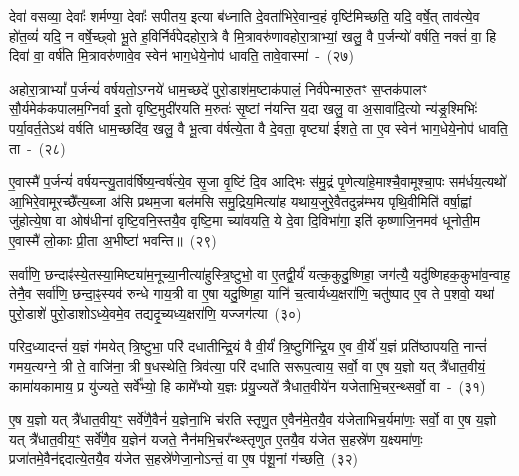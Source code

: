 देवा॑ वसव्या॒ देवाः᳚ शर्मण्या॒ देवाः᳚ सपीतय॒ इत्या ब॑ध्नाति दे॒वता॑भिरे॒वान्व॒हं वृष्टि॑मिच्छति॒ यदि॒ वर्\mbox{}षे॒त् ताव॑त्ये॒व हो॑त॒व्यं॑ यदि॒ न वर्\mbox{}षे॒च्छ्वो भू॒ते ह॒विर्निर्व॑पेदहोरा॒त्रे वै मि॒त्रावरु॑णावहोरा॒त्राभ्यां॒ खलु॒ वै प॒र्जन्यो॑ वर्\mbox{}षति॒ नक्तं॑ वा॒ हि दिवा॑ वा॒ वर्\mbox{}ष॑ति मि॒त्रावरु॑णावे॒व स्वेन॑ भाग॒धेये॒नोप॑ धावति॒ तावे॒वास्मा॑~-~(२७)

अहोरा॒त्रा\-भ्यां᳚ प॒र्जन्यं॑ वर्\mbox{}षयतो॒\-ऽग्नये॑ धाम॒च्छदे॑ पुरो॒डाश॑\-म॒ष्टा\-क॑पालं॒ निर्व॑पेन्मारु॒तꣳ स॒प्तक॑पालꣳ सौ॒र्यमेक॑कपालम॒ग्निर्वा इ॒तो वृष्टि॒मुदी॑रयति म॒रुतः॑ सृ॒ष्टां न॑यन्ति य॒दा खलु॒ वा अ॒सावा॑दि॒त्यो न्य॑ङ्र॒श्मिभिः॑ पर्या॒वर्त॒ते\-ऽथ॑ वर्\mbox{}षति धाम॒च्छदि॑व॒ खलु॒ वै भू॒त्वा व॑र्\mbox{}षत्ये॒ता वै दे॒वता॒ वृष्ट्या॑ ईशते॒ ता ए॒व स्वेन॑ भाग॒धेये॒नोप॑ धावति॒ ता~-~(२८)

ए॒वास्मै॑ प॒र्जन्यं॑ वर्\mbox{}षयन्त्यु॒ताव॑र्\mbox{}षिष्य॒न्वर्\mbox{}ष॑त्ये॒व सृ॒जा वृ॒ष्टिं दि॒व आद्भिः स॑मु॒द्रं पृ॒णेत्या॑हे॒माश्चै॒वामूश्चा॒पः सम॑र्धय॒त्यथो॑ आ॒भिरे॒वामूरच्छै᳚त्य॒ब्जा अ॑सि प्रथम॒जा बल॑मसि समु॒द्रिय॒मित्या॑ह यथाय॒जुरे॒वैतदुन्न॑म्भय पृथि॒वीमिति॑ वर्\mbox{}षा॒ह्वां जु॑होत्ये॒षा वा ओष॑धीनां वृष्टि॒वनि॒स्तयै॒व वृष्टि॒मा च्या॑वयति॒ ये दे॒वा दि॒विभा॑गा॒ इति॑ कृष्णाजि॒नमव॑ धूनोती॒म ए॒वास्मै॑ लो॒काः प्री॒ता अ॒भीष्टा॑ भवन्ति॥~(२९)

{\anuvakamend[{अ॒स्मै॒ धा॒व॒ति॒ ता वा एक॑विꣳशतिश्च}]}%

सर्वा॑णि॒ छन्दाꣴ॑स्ये॒तस्या॒मिष्ट्या॑म॒नूच्या॒नीत्या॑हुस्त्रि॒ष्टुभो॒ वा ए॒तद्वी॒र्यं॑ यत्क॒कुदु॒ष्णिहा॒ जग॑त्यै॒ यदु॑ष्णिहक॒कुभा॑व॒न्वाह॒ तेनै॒व सर्वा॑णि॒ छन्दा॒ꣴ॒स्यव॑ रुन्धे गाय॒त्री वा ए॒षा यदु॒ष्णिहा॒ यानि॑ च॒त्वार्यध्य॒क्षरा॑णि॒ चतु॑ष्पाद ए॒व ते प॒शवो॒ यथा॑ पुरो॒डाशे॑ पुरो॒डाशो\-ऽध्ये॒वमे॒व तद्यदृ॒च्यध्य॒क्षरा॑णि॒ यज्जग॑त्या~(३०)

परिद॒ध्यादन्तं॑ य॒ज्ञं ग॑मयेत् त्रि॒ष्टुभा॒ परि॑ दधातीन्द्रि॒यं वै वी॒र्यं॑ त्रि॒ष्टुगि॑न्द्रि॒य ए॒व वी॒र्ये॑ य॒ज्ञं प्रति॑\-ष्ठापयति॒ नान्तं॑ गमय॒त्यग्ने॒ त्री ते॒ वाजि॑ना॒ त्री ष॒धस्थेति॒ त्रिव॑त्या॒ परि॑ दधाति सरूप॒त्वाय॒ सर्वो॒ वा ए॒ष य॒ज्ञो यत् त्रै॑धात॒वीयं॒ कामा॑यकामाय॒ प्र यु॑ज्यते॒ सर्वे᳚भ्यो॒ हि कामे᳚भ्यो य॒ज्ञः प्र॑यु॒ज्यते᳚ त्रैधात॒वीये॑न यजेताभि॒चर॒न्थ्सर्वो॒ \mbox{वा~-~(३१)}

ए॒ष य॒ज्ञो यत् त्रै॑धात॒वीय॒ꣳ॒ सर्वे॑णै॒वैनं॑ य॒ज्ञेना॒भि च॑रति स्तृणु॒त ए॒वैन॑मे॒तयै॒व य॑जेताभिच॒र्यमा॑णः॒ सर्वो॒ वा ए॒ष य॒ज्ञो यत् त्रै॑धात॒वीय॒ꣳ॒ सर्वे॑णै॒व य॒ज्ञेन॑ यजते॒ नैन॑मभि॒चर᳚न्थ्स्तृणुत ए॒तयै॒व य॑जेत स॒हस्रे॑ण य॒क्ष्यमा॑णः॒ प्रजा॑तमे॒वैन॑द्ददात्ये॒तयै॒व य॑जेत स॒हस्रे॑णेजा॒नो\-ऽन्तं॒ वा ए॒ष प॑शू॒नां ग॑च्छति॒~(३२)

